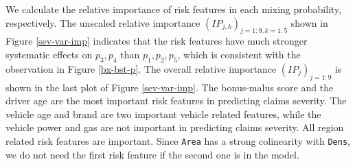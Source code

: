 \documentclass[11pt]{article}
\numberwithin{equation}{section}
\begin{document}
We calculate the relative importance of risk features in each mixing probability, respectively. 
The unscaled relative importance $(IP_{j,k})_{j=1:9,k=1:5}$ shown in Figure \eqref{sev-var-imp} indicates that the risk features have much stronger systematic effects on $p_3,p_4$ than $p_1,p_2,p_5$, which is consistent with the observation in Figure \eqref{bx-bst-p}.
The overall relative importance $(IP_{j})_{j=1:9}$ is shown in the last plot of Figure \ref{sev-var-imp}.
The bonus-malus score and the driver age are the most important risk features in predicting claims severity.   
The vehicle age and brand are two important vehicle related features, while the vehicle power and gas are not important in predicting claims severity.
All region related risk features are important. Since {\tt Area} has a strong colinearity with {\tt Dens}, we do not need the first risk feature if the second one is in the model.
\end{document}
